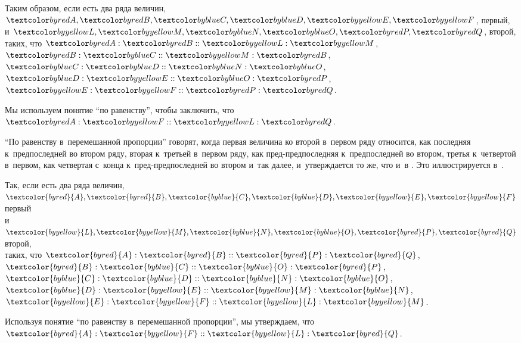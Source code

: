 \documentclass[letters,booklanguage=russian]{byrnebook}
\begin{document}
\begin{center}
Таким образом, если есть два ряда величин,\\
$\varA, \varB, \varC, \varD, \varE, \varF$, первый,\\
и $\varL, \varM, \varN, \varO, \varP, \varQ$, второй,\\
таких, что $\varA : \varB :: \varL : \varM$, $\varB : \varC :: \varM : \varB$, $\varC : \varD :: \varN : \varO$, $\varD : \varE :: \varO : \varP$, $\varE : \varF :: \varP : \varQ$.

Мы используем понятие \enquote{по равенству}, чтобы заключить, что $\varA : \varF :: \varL : \varQ$.
\end{center}

\vfill\pagebreak

\label{def:V.XX}
\def\varA{\textcolor{byred}{A}}
\def\varB{\textcolor{byred}{B}}
\def\varC{\textcolor{byblue}{C}}
\def\varD{\textcolor{byblue}{D}}
\def\varE{\textcolor{byyellow}{E}}
\def\varF{\textcolor{byyellow}{F}}
\def\varL{\textcolor{byyellow}{L}}
\def\varM{\textcolor{byyellow}{M}}
\def\varN{\textcolor{byblue}{N}}
\def\varO{\textcolor{byblue}{O}}
\def\varP{\textcolor{byred}{P}}
\def\varQ{\textcolor{byred}{Q}}
\enquote{По равенству в~перемешанной пропорции} говорят, когда первая величина ко второй в~первом ряду относится, как последняя к~предпоследней во втором ряду, вторая к~третьей в~первом ряду, как пред-предпоследняя к~предпоследней во втором, третья к~четвертой в~первом, как четвертая с~конца к~пред-предпоследней во втором и~так далее, и~утверждается то же, что и~в . Это иллюстрируется в~.

\begin{center}
Так, если есть два ряда величин,\\
$\varA, \varB, \varC, \varD, \varE, \varF$ первый\\
и $\varL, \varM, \varN, \varO, \varP, \varQ$ второй,\\
таких, что $\varA : \varB :: \varP : \varQ$, $\varB : \varC :: \varO : \varP$, $\varC : \varD :: \varN : \varO$, $\varD : \varE :: \varM : \varN$, $\varE : \varF :: \varL : \varM$.

Используя понятие \enquote{по равенству в~перемешанной пропорции}, мы утверждаем, что $\varA : \varF :: \varL : \varQ$.
\end{center}

\vfill\pagebreak

\label{prop:V.XX}
\end{document}
